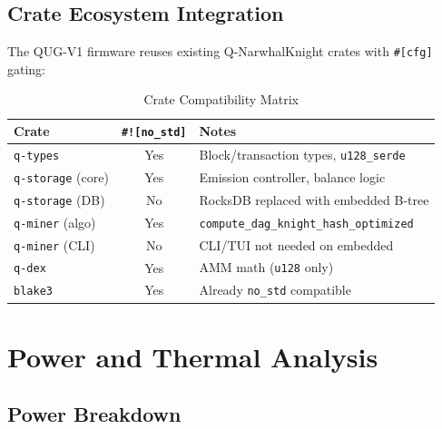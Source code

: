 \documentclass[11pt,a4paper]{article}
\begin{document}
\subsection{Crate Ecosystem Integration}

The QUG-V1 firmware reuses existing Q-NarwhalKnight crates with \texttt{\#[cfg]} gating:

\begin{table}[H]
\centering
\caption{Crate Compatibility Matrix}
\begin{tabular}{@{}lcl@{}}
\toprule
\textbf{Crate} & \textbf{\texttt{\#![no\_std]}} & \textbf{Notes} \\
\midrule
\texttt{q-types} & Yes & Block/transaction types, \texttt{u128\_serde} \\
\texttt{q-storage} (core) & Yes & Emission controller, balance logic \\
\texttt{q-storage} (DB) & No & RocksDB replaced with embedded B-tree \\
\texttt{q-miner} (algo) & Yes & \texttt{compute\_dag\_knight\_hash\_optimized} \\
\texttt{q-miner} (CLI) & No & CLI/TUI not needed on embedded \\
\texttt{q-dex} & Yes & AMM math (\texttt{u128} only) \\
\texttt{blake3} & Yes & Already \texttt{no\_std} compatible \\
\bottomrule
\end{tabular}
\end{table}

\section{Power and Thermal Analysis}
\label{sec:power}

\subsection{Power Breakdown}
\end{document}
